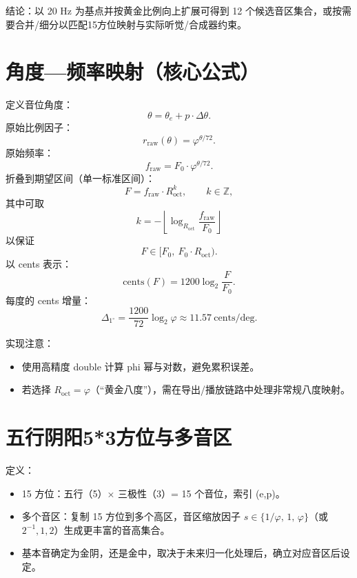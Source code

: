 \documentclass{article}
\begin{document}
结论：以 20 Hz 为基点并按黄金比例向上扩展可得到 12 个候选音区集合，或按需要合并/细分以匹配15方位映射与实际听觉/合成器约束。

\section{角度—频率映射（核心公式）}
定义音位角度：
\[
\theta = \theta_e + p\cdot\Delta\theta .
\]
原始比例因子：
\[
r_{\mathrm{raw}}(\theta)=\varphi^{\theta/72}.
\]
原始频率：
\[
f_{\mathrm{raw}} = F_{0}\cdot \varphi^{\theta/72}.
\]
折叠到期望区间（单一标准区间）：
\[
F = f_{\mathrm{raw}}\cdot R_{\mathrm{oct}}^{k},\qquad k\in\mathbb{Z},
\]
其中可取
\[
k = -\left\lfloor \log_{R_{\mathrm{oct}}}\dfrac{f_{\mathrm{raw}}}{F_{0}} \right\rfloor
\]
以保证
\[
F\in [F_{0},\ F_{0}\cdot R_{\mathrm{oct}}).
\]
以 cents 表示：
\[
\mathrm{cents}(F) = 1200\log_2\frac{F}{F_0}.
\]
每度的 cents 增量：
\[
\Delta_{1^\circ} = \frac{1200}{72}\log_2\varphi \approx 11.57\ \text{cents/deg}.
\]

实现注意：
\begin{itemize}
  \item 使用高精度 double 计算 phi 幂与对数，避免累积误差。
  \item 若选择 $R_{\mathrm{oct}}=\varphi$（“黄金八度”），需在导出/播放链路中处理非常规八度映射。
\end{itemize}

\section{五行阴阳5*3方位与多音区}
定义：
\begin{itemize}
  \item 15 方位：五行（5）× 三极性（3）= 15 个音位，索引 (e,p)。
  \item 多个音区：复制 15 方位到多个高区，音区缩放因子 $s\in\{1/\varphi,\,1,\,\varphi\}$（或 $2^{-1},1,2$）生成更丰富的音高集合。
  \item 基本音确定为金阴，还是金中，取决于未来归一化处理后，确立对应音区后设定。
\end{itemize}
\end{document}
